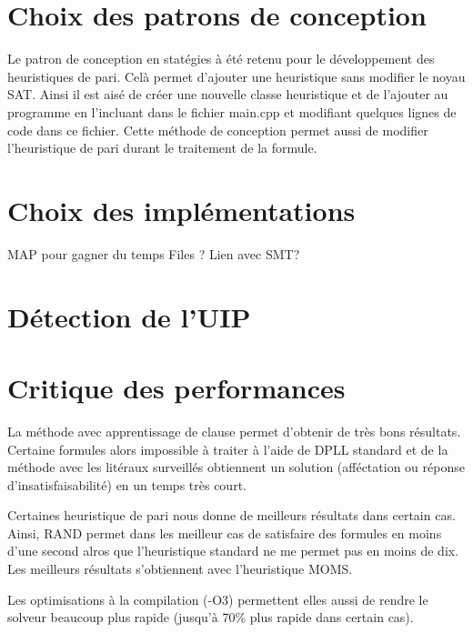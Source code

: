 \documentclass{article}
\begin{document}
\section{Choix des patrons de conception}
Le patron de conception en statégies à été retenu pour le développement des heuristiques de pari. Celà permet d'ajouter une heuristique sans modifier le noyau SAT. Ainsi il est aisé de créer une nouvelle classe heuristique et de l'ajouter au programme en l'incluant dans le fichier main.cpp et modifiant quelques lignes de code dans ce fichier.
Cette méthode de conception permet aussi de modifier l'heuristique de pari durant le traitement de la formule.

\section{Choix des implémentations}
MAP pour gagner du temps
Files ?
Lien avec SMT?

\section{Détection de l'UIP}

\section{Critique des performances}
La méthode avec apprentissage de clause permet d'obtenir de très bons résultats. Certaine formules alors impossible à traiter à l'aide de DPLL standard et de la méthode avec les litéraux surveillés obtiennent un solution (afféctation ou réponse d'insatisfaisabilité) en un temps très court.

Certaines heuristique de pari nous donne de meilleurs résultats dans certain cas. Ainsi, RAND permet dans les meilleur cas de satisfaire des formules en moins d'une second alros que l'heuristique standard ne me permet pas en moins de dix. Les meilleurs résultats s'obtiennent avec l'heuristique MOMS.

Les optimisations à la compilation (-O3) permettent elles aussi de rendre le solveur beaucoup plus rapide (jusqu'à 70\% plus rapide dans certain cas).



\end{document}
